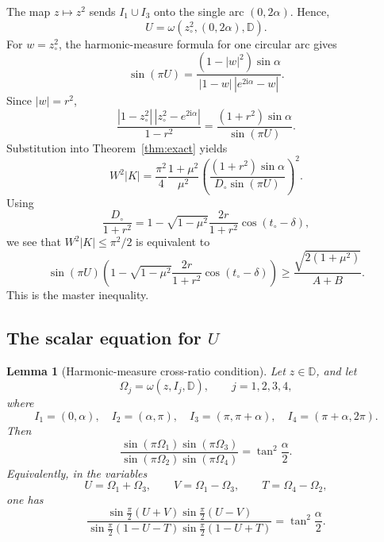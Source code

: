 \documentclass[11pt]{amsart}
\newtheorem{lemma}[theorem]{Lemma}
\theoremstyle{remark}
\newcommand{\D}{\mathbb D}
\newcommand{\ii}{\mathrm i}
\newcommand{\zc}{z_\circ}
\newcommand{\Dc}{D_\circ}
\numberwithin{equation}{section}
\begin{document}
The map $z\mapsto z^2$ sends $I_1\cup I_3$ onto the single arc $(0,2\alpha)$. Hence,
\[
        U=\omega(\zc^2,(0,2\alpha),\D).
\]
For $w=\zc^2$, the harmonic-measure formula for one circular arc gives
\[
        \sin(\pi U)
        =\frac{(1-|w|^2)\sin\alpha}{|1-w|\,|e^{2\ii\alpha}-w|}.
\]
Since $|w|=r^2$,
\[
        \frac{|1-\zc^2|\,|\zc^2-e^{2\ii\alpha}|}{1-r^2}
        =\frac{(1+r^2)\sin\alpha}{\sin(\pi U)}.
\]
Substitution into Theorem~\ref{thm:exact} yields
\[
        W^2|K|
        =\frac{\pi^2}{4}\frac{1+\mu^2}{\mu^2}
        \left(\frac{(1+r^2)\sin\alpha}{\Dc\sin(\pi U)}\right)^2.
\]
Using
\[
        \frac{\Dc}{1+r^2}
        =1-\sqrt{1-\mu^2}\frac{2r}{1+r^2}\cos(t_\circ-\delta),
\]
we see that $W^2|K|\leq \pi^2/2$ is equivalent to
\[
        \sin(\pi U)
        \left(1-\sqrt{1-\mu^2}\frac{2r}{1+r^2}\cos(t_\circ-\delta)\right)
        \geq
        \frac{\sqrt{2(1+
        \mu^2)}}{A+B}.
\]
This is the master inequality.

\subsection{The scalar equation for \texorpdfstring{$U$}{U}}
\begin{lemma}[Harmonic-measure cross-ratio condition]\label{lem:hm-crossratio}
Let \(z\in\mathbb D\), and let
\[
        \Omega_j=\omega(z,I_j,\mathbb D),
        \qquad j=1,2,3,4,
\]
where
\[
        I_1=(0,\alpha),\quad
        I_2=(\alpha,\pi),\quad
        I_3=(\pi,\pi+\alpha),\quad
        I_4=(\pi+\alpha,2\pi).
\]
Then
\[
\frac{
\sin(\pi\Omega_1)\sin(\pi\Omega_3)}
{\sin(\pi\Omega_2)\sin(\pi\Omega_4)}
        =\tan^2\frac{\alpha}{2}.
\]
Equivalently, in the variables
\[
        U=\Omega_1+\Omega_3,\qquad
        V=\Omega_1-\Omega_3,\qquad
        T=\Omega_4-\Omega_2,
\]
one has
\[
\frac{
\sin\frac{\pi}{2}(U+V)
\sin\frac{\pi}{2}(U-V)}
{
\sin\frac{\pi}{2}(1-U-T)
\sin\frac{\pi}{2}(1-U+T)}
        =\tan^2\frac{\alpha}{2}.
\]
\end{lemma}
\end{document}
